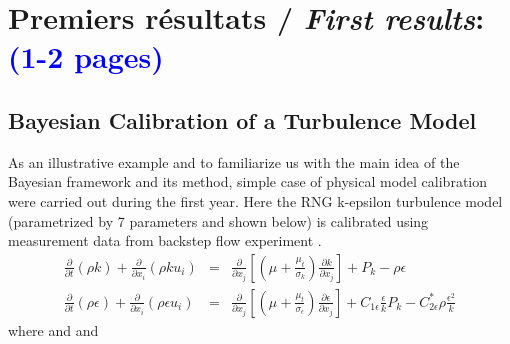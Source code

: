\documentclass[11pt,titlepage]{article}
\begin{document}
\newpage
\section{Premiers résultats /  {\large\textit{First results}}: \textcolor{blue}{(1-2 pages)}}


\subsection{Bayesian Calibration of a Turbulence Model}

As an illustrative example and to familiarize us with the main idea of the Bayesian framework and its method, simple case of physical model calibration were carried out during the first year. 
Here the RNG k-epsilon turbulence model (parametrized by 7 parameters and shown below) is calibrated using measurement data from backstep flow experiment \cite{Kasagi1995}. 
\begin{equation}
\begin{array}{rrl}

\frac{\partial}{\partial t} (\rho k) + \frac{\partial}{\partial x_i} (\rho k u_i) & = & \frac{\partial}{\partial x_j} \left[\left(\mu+\frac{\mu_t}{\sigma_k}\right) \frac{\partial k}{\partial x_j}\right] + P_k - \rho \epsilon \\
\frac{\partial}{\partial t} (\rho \epsilon) + \frac{\partial}{\partial x_i} (\rho \epsilon u_i) & = & \frac{\partial}{\partial x_j} \left[\left(\mu+\frac{\mu_t}{\sigma_{\epsilon}}\right) \frac{\partial \epsilon}{\partial x_j}\right] + C_{1 \epsilon}\frac{\epsilon}{k} P_k - C_{2\epsilon}^* \rho \frac{\epsilon^2}{k}

\end{array}
\nonumber
\end{equation}
where
and
and
\end{document}
